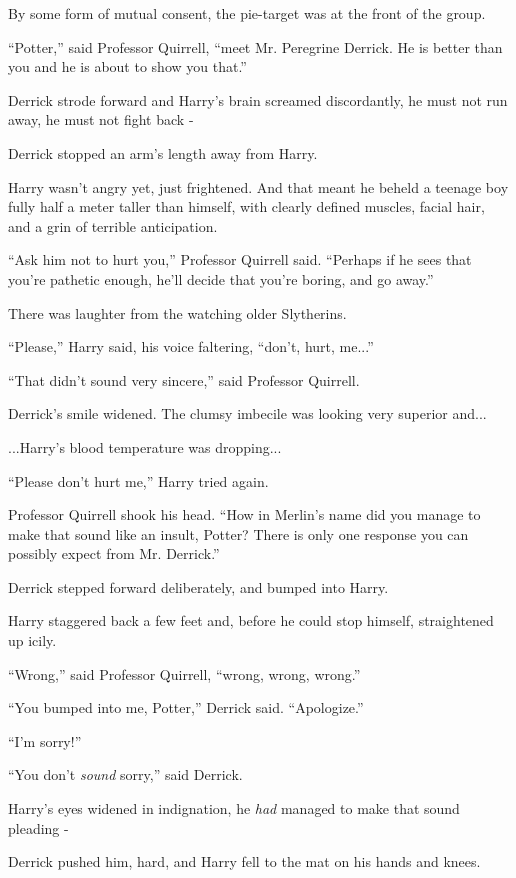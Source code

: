 By some form of mutual consent, the pie-target was at the front of the group.

``Potter,'' said Professor Quirrell, ``meet Mr. Peregrine Derrick. He is better than you and he is about to show you that.''

Derrick strode forward and Harry's brain screamed discordantly, he must not run away, he must not fight back -

Derrick stopped an arm's length away from Harry.

Harry wasn't angry yet, just frightened. And that meant he beheld a teenage boy fully half a meter taller than himself, with clearly defined muscles, facial hair, and a grin of terrible anticipation.

``Ask him not to hurt you,'' Professor Quirrell said. ``Perhaps if he sees that you're pathetic enough, he'll decide that you're boring, and go away.''

There was laughter from the watching older Slytherins.

``Please,'' Harry said, his voice faltering, ``don't, hurt, me...''

``That didn't sound very sincere,'' said Professor Quirrell.

Derrick's smile widened. The clumsy imbecile was looking very superior and...

...Harry's blood temperature was dropping...

``Please don't hurt me,'' Harry tried again.

Professor Quirrell shook his head. ``How in Merlin's name did you manage to make that sound like an insult, Potter? There is only one response you can possibly expect from Mr. Derrick.''

Derrick stepped forward deliberately, and bumped into Harry.

Harry staggered back a few feet and, before he could stop himself, straightened up icily.

``Wrong,'' said Professor Quirrell, ``wrong, wrong, wrong.''

``You bumped into me, Potter,'' Derrick said. ``Apologize.''

``I'm sorry!''

``You don't \emph{sound} sorry,'' said Derrick.

Harry's eyes widened in indignation, he \emph{had} managed to make that sound pleading -

Derrick pushed him, hard, and Harry fell to the mat on his hands and knees.

